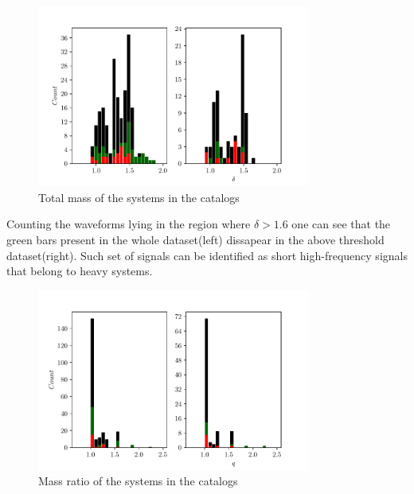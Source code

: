 \begin{figure}[hbt!]
\begin{center}
\includegraphics[width=0.8\textwidth, angle=0]{images/Data_analysis/results/alpha_deltahist.pdf}
\caption{Total mass of the systems in the catalogs}
\label{adelhist}
\end{center}
\end{figure}

Counting the waveforms lying in the region where $\delta>1.6$ one can see that the green bars present in the whole dataset(left) dissapear in the above threshold dataset(right). Such set of signals can be identified as short high-frequency signals that belong to heavy systems. 

\begin{figure}[hbt!]
\begin{center}
\includegraphics[width=0.8\textwidth, angle=0]{images/Data_analysis/results/alpha_qhist.pdf}
\caption{Mass ratio of the systems in the catalogs}
\label{aqhist}
\end{center}
\end{figure}

